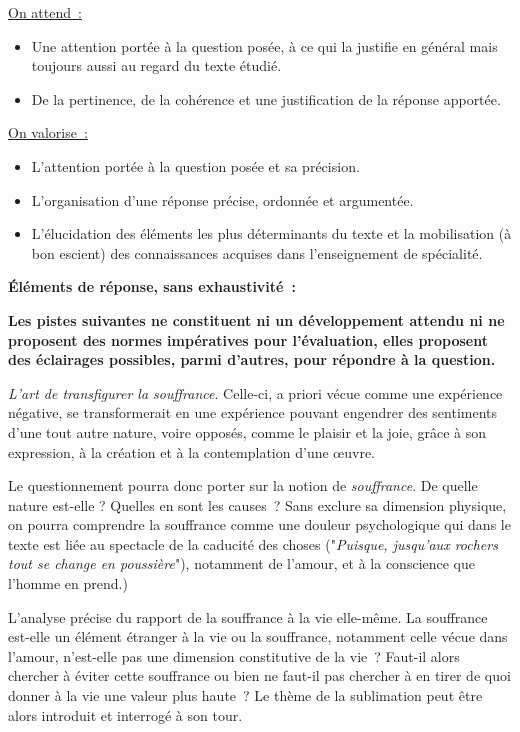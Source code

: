 {\underline{On attend~:}

\begin{itemize}
\item Une attention portée à la question posée, à ce qui la justifie en général mais toujours aussi
au regard du texte étudié.
\item De la pertinence, de la cohérence et une justification de la réponse apportée.
\end{itemize}
\underline{On valorise~:}
\begin{itemize}
\item L'attention portée à la question posée et sa précision.
\item L'organisation d'une réponse précise, ordonnée et argumentée.
\item L'élucidation des éléments les plus déterminants du texte et la mobilisation (à bon escient)
des connaissances acquises dans l'enseignement de spécialité.
\end{itemize}

\textbf{Éléments de réponse, sans exhaustivité~:}

\textbf{Les pistes suivantes ne constituent ni un développement attendu ni ne proposent des
normes impératives pour l'évaluation, elles proposent des éclairages possibles, parmi
d'autres, pour répondre à la question.}

\textit{L'art de transfigurer la souffrance}. Celle-ci, a priori vécue comme une expérience négative, se
transformerait en une expérience pouvant engendrer des sentiments d'une tout autre nature,
voire opposés, comme le plaisir et la joie, grâce à son expression, à la création et à la
contemplation d'une œuvre.

Le questionnement pourra donc porter sur la notion de \textit{souffrance}. De quelle nature est-elle
? Quelles en sont les causes~? Sans exclure sa dimension physique, on pourra comprendre la
souffrance comme une douleur psychologique qui dans le texte est liée au spectacle de la
caducité des choses ("\textit{Puisque, jusqu'aux rochers tout se change en poussière}"), notamment de
l'amour, et à la conscience que l'homme en prend.)

L'analyse précise du rapport de la souffrance à la vie elle-même. La souffrance est-elle un
élément étranger à la vie ou la souffrance, notamment celle vécue dans l'amour, n'est-elle pas
une dimension constitutive de la vie~? Faut-il alors chercher à éviter cette souffrance ou bien ne
faut-il pas chercher à en tirer de quoi donner à la vie une valeur plus haute~? Le thème de la
sublimation peut être alors introduit et interrogé à son tour.

}
